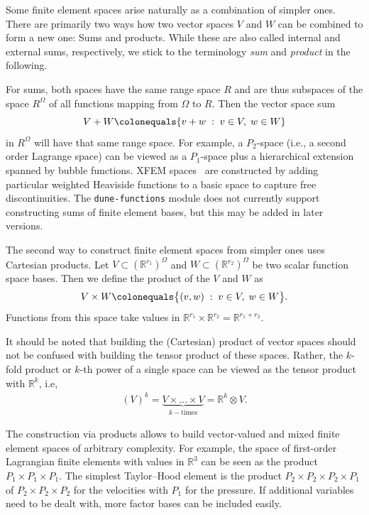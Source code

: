 \documentclass[a4paper,10pt,headings=normal,bibliography=totoc]{scrartcl}
\newcommand{\R}{\mathbb{R}}
\newcommand{\st}{\; : \;}
\newcommand{\dunemodule}[1]{\texttt{#1}}
\begin{document}
Some finite element spaces arise naturally as a combination of simpler ones.
There are primarily two ways how two vector spaces $V$ and $W$ can be combined
to form a new one: Sums and products. While these are also called
internal and external sums, respectively, we stick to the terminology
\emph{sum} and \emph{product} in the following.

For sums, both spaces
have the same range space $R$ and are thus subspaces of the space $R^\Omega$
of all functions mapping from $\Omega$ to $R$. Then the vector space sum
\begin{equation*}
  V + W
  \colonequals
  \{ v + w \; : \; v \in V, \; w \in W \}
\end{equation*}
in $R^\Omega$ will have that same range space.
For example, a $P_2$-space (i.e., a second order Lagrange space)
can be viewed as a $P_1$-space plus a hierarchical extension spanned by bubble functions.
XFEM spaces~\cite{moes_dolbow_belytschko:1999} are constructed by adding particular weighted Heaviside
functions to a basic space to capture free discontinuities.
The \dunemodule{dune-functions} module does not currently support constructing sums
of finite element bases, but this may be added in later versions.

The second way to construct finite element spaces from simpler ones uses Cartesian products.
Let $V \subset (\R^{r_1})^\Omega$ and $W \subset (\R^{r_2})^\Omega$ be two scalar function space bases.
Then we define the product of the $V$ and $W$ as
\begin{align*}
  V \times W
    \colonequals \big\{ (v,w) \st v \in V, \; w \in W \big\}.
\end{align*}
Functions from this space take values in $\R^{r_1} \times \R^{r_2} = \R^{r_1 + r_2}$.

It should be noted that building the (Cartesian) product of
vector spaces should not be confused with building the tensor product of these spaces.
Rather, the $k$-fold product or $k$-th power
of a single space can be viewed as the tensor product with $\R^k$, i.e,
\begin{align*}
    (V)^k
    = \underbrace{V \times \dots \times V}_{k-\text{times}}
    = \R^k \otimes V.
\end{align*}

The construction via products allows to build vector-valued and mixed finite element spaces of arbitrary complexity.
For example, the space of
first-order Lagrangian finite elements with values in $\R^3$ can be seen as the product $P_1 \times P_1 \times P_1$.
The simplest Taylor--Hood element is the product $P_2 \times P_2 \times P_2 \times P_1$
of $P_2 \times P_2 \times P_2$ for the velocities with $P_1$ for the pressure.
If additional variables need to be dealt with, more factor bases can be included easily.
\end{document}

